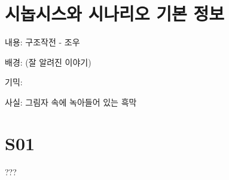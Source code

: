 \documentclass{report}
\begin{document}
	\section{시놉시스와 시나리오 기본 정보}
		내용: 구조작전 - 조우
		
		배경: (잘 알려진 이야기)
		
		기믹: 
		
		사실: 그림자 속에 녹아들어 있는 흑막
	
	\section{S01}
		???
\end{document}
